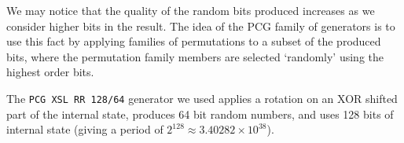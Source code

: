 \documentclass[10pt, a4paper]{article}
\begin{document}
We may notice that the quality of the random bits produced increases as we consider higher bits
in the result\cite{pcg}. The idea of the PCG family of generators is to use this fact by
applying families of permutations to a subset of the produced bits, where the permutation family
members are selected `randomly' using the highest order bits.

The \texttt{PCG XSL RR 128/64} generator we used applies a rotation on an XOR shifted part of the
internal state, produces 64 bit random numbers, and uses 128 bits of internal state (giving a
period of $2^{128} \approx 3.40282\times10^{38}$)\cite{pcg}.
\end{document}
